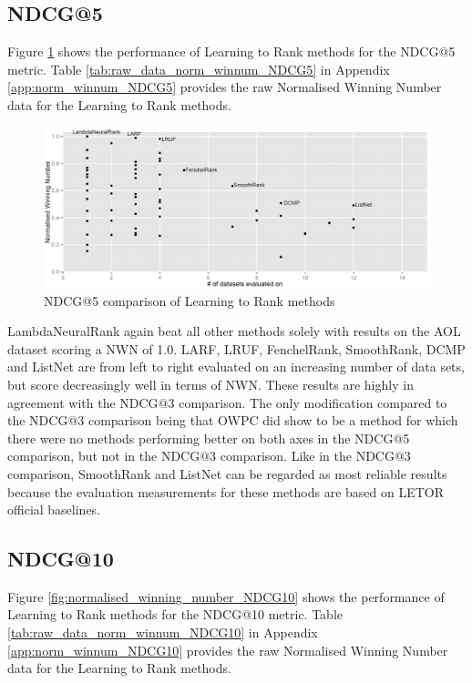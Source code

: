 \subsection{NDCG@5}
Figure \ref{fig:normalised_winning_number_NDCG5} shows the performance of Learning to Rank methods for the \ac{NDCG}@5 metric. Table \ref{tab:raw_data_norm_winnum_NDCG5} in Appendix \ref{app:norm_winnum_NDCG5} provides the raw Normalised Winning Number data for the Learning to Rank methods.\\

\begin{figure}[!h]
\includegraphics[scale=0.285]{gfx/ndcg5_winnum}
\caption{\acs{NDCG}@5 comparison of Learning to Rank methods}
\label{fig:normalised_winning_number_NDCG5}
\end{figure}

LambdaNeuralRank again beat all other methods solely with results on the AOL dataset scoring a \ac{NWN} of 1.0. LARF, LRUF, FenchelRank, SmoothRank, DCMP and ListNet are from left to right evaluated on an increasing number of data sets, but score decreasingly well in terms of \ac{NWN}. These results are highly in agreement with the \ac{NDCG}@3 comparison. The only modification compared to the \ac{NDCG}@3 comparison being that OWPC did show to be a method for which there were no methods performing better on both axes in the \ac{NDCG}@5 comparison, but not in the \ac{NDCG}@3 comparison. Like in the \ac{NDCG}@3 comparison, SmoothRank and ListNet can be regarded as most reliable results because the evaluation measurements for these methods are based on LETOR official baselines.

\subsection{NDCG@10}
Figure \ref{fig:normalised_winning_number_NDCG10} shows the performance of Learning to Rank methods for the \ac{NDCG}@10 metric. Table \ref{tab:raw_data_norm_winnum_NDCG10} in Appendix \ref{app:norm_winnum_NDCG10} provides the raw Normalised Winning Number data for the Learning to Rank methods.\\

